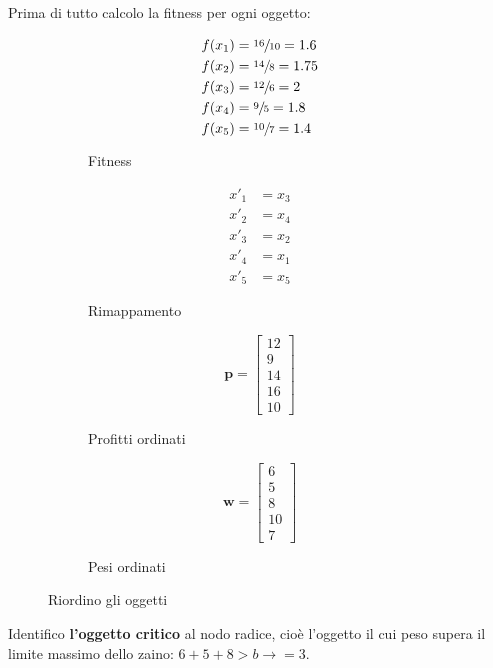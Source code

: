 \documentclass[\main/main.tex]{subfiles}
\begin{document}
Prima di tutto calcolo la fitness per ogni oggetto:

\begin{figure}
  \begin{subfigure}{0.24\textwidth}
    \begin{align*}
      f(x_1) & = \sfrac{16}{10} = 1.6 \\
      f(x_2) & = \sfrac{14}{8} = 1.75 \\
      f(x_3) & = \sfrac{12}{6} = 2    \\
      f(x_4) & = \sfrac{9}{5} = 1.8   \\
      f(x_5) & = \sfrac{10}{7} = 1.4
    \end{align*}
    \caption{Fitness}
  \end{subfigure}
  \begin{subfigure}{0.24\textwidth}
    \begin{align*}
      x'_1 & = x_3 \\
      x'_2 & = x_4 \\
      x'_3 & = x_2 \\
      x'_4 & = x_1 \\
      x'_5 & = x_5
    \end{align*}
    \caption{Rimappamento}
  \end{subfigure}
  \begin{subfigure}{0.24\textwidth}
    \[
      \bm{p} = \begin{bmatrix}
        12 \\
        9  \\
        14 \\
        16 \\
        10
      \end{bmatrix}
    \]
    \caption{Profitti ordinati}
  \end{subfigure}
  \begin{subfigure}{0.24\textwidth}
    \[
      \bm{w} = \begin{bmatrix}
        6  \\
        5  \\
        8  \\
        10 \\
        7
      \end{bmatrix}
    \]
    \caption{Pesi ordinati}
  \end{subfigure}
  \caption{Riordino gli oggetti}
\end{figure}

Identifico \textbf{l'oggetto critico} al nodo radice, cioè l'oggetto il cui peso supera il limite massimo dello zaino: $6+5+8>b\rightarrow = 3$.
\end{document}
